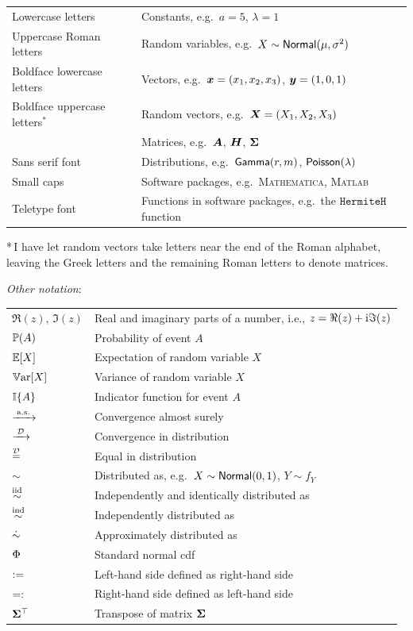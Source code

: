 \begin{tabular}{ll}
Lowercase letters & Constants, e.g.\ $a = 5$, $\lambda = 1$ \\
Uppercase Roman letters & Random variables, e.g.\ $X \sim \mathsf{Normal}(\mu, \sigma^2)$ \\
Boldface lowercase letters & Vectors, e.g.\ $\bm{x} = (x_1, x_2, x_3)$, $\bm{y} = (1, 0, 1)$ \\
Boldface uppercase letters${}^*$ & Random vectors, e.g.\ $\bm{X} = (X_1, X_2, X_3)$ \\
                           & Matrices, e.g.\ $\bm{A}$, $\bm{H}$, $\bm{\Sigma}$ \\
Sans serif font & Distributions, e.g.\ $\mathsf{Gamma}(r,m)$, $\mathsf{Poisson}(\lambda)$ \\
Small caps & Software packages, e.g.\ \textsc{Mathematica}, \textsc{Matlab} \\
Teletype font & Functions in software packages, e.g.\ the $\texttt{HermiteH}$ function \\
\end{tabular}

*\,I have let random vectors take letters near the end of the Roman alphabet, leaving the Greek letters and the remaining Roman letters to denote matrices.


\emph{Other notation}:

\begin{tabular}{ll}
$\Re(z)$, $\Im(z)$ & Real and imaginary parts of a number, i.e., $z = \Re(z) + \mathrm{i} \Im(z)$ \\
$\operatorname{{\mathbb P}}(A)$ & Probability of event $A$ \\
$\operatorname{{\mathbb E}}[X]$ & Expectation of random variable $X$ \\
$\operatorname{\mathbb{V}\mathrm{ar}}[X]$ & Variance of random variable $X$ \\
$\mathbb{I}\{ A \}$ & Indicator function for event $A$ \\
$\xrightarrow{\:\smash{\mathrm{a.s.}}\:}$ & Convergence almost surely \\
$\xrightarrow{\:\smash{\mathcal{D}}\:}$ &  Convergence in distribution \\
$\stackrel{\smash{\mathcal{D}}}{=}$ & Equal in distribution \\
$\sim$ & Distributed as, e.g.\ $X \sim \mathsf{Normal}(0,1)$, $Y \sim f_Y$ \\
$\overset{\smash{\mathrm{iid}}}{\sim}$ & Independently and identically distributed as \\
$\overset{\smash{\mathrm{ind}}}{\sim}$ & Independently distributed as \\
$\mathrel{\dot\sim}$ & Approximately distributed as \\
$\mathrm{\Phi}$ & Standard normal cdf \\
$:=$ & Left-hand side defined as right-hand side \\
$=:$ & Right-hand side defined as left-hand side \\
$\bm{\Sigma}^{\top}$ & Transpose of matrix $\bm{\Sigma}$
\end{tabular}

